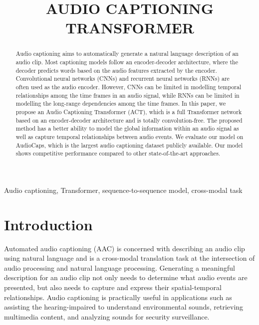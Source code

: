\documentclass{article}
\title{AUDIO CAPTIONING TRANSFORMER}
\begin{document}
\ninept
\maketitle

\begin{sloppy}

\begin{abstract}
Audio captioning aims to automatically generate a natural language description of an audio clip. Most captioning models follow an encoder-decoder architecture, where the decoder predicts words based on the audio features extracted by the encoder. Convolutional neural networks (CNNs) and recurrent neural networks (RNNs) are often used as the audio encoder. However, CNNs can be limited in modelling temporal relationships among the time frames in an audio signal, while RNNs can be limited in modelling the long-range dependencies among the time frames. In this paper, we propose an Audio Captioning Transformer (ACT), which is a full Transformer network based on an encoder-decoder architecture and is totally convolution-free. The proposed method has a better ability to model the global information within an audio signal as well as capture temporal relationships between audio events. We evaluate our model on AudioCaps, which is the largest audio captioning dataset publicly available. Our model shows competitive performance compared to other state-of-the-art approaches.
\end{abstract}

\begin{keywords}
Audio captioning, Transformer, sequence-to-sequence model, cross-modal task
\end{keywords}

\section{Introduction}
\label{sec:intro}
Automated audio captioning (AAC) is concerned with describing an audio clip using natural language and is a cross-modal translation task at the intersection of audio processing and natural language processing. Generating a meaningful description for an audio clip not only needs to determine what audio events are presented, but also needs to capture and express their spatial-temporal relationships. Audio captioning is practically useful in applications such as assisting the hearing-impaired to understand environmental sounds, retrieving multimedia content, and analyzing sounds for security surveillance. 


\end{sloppy}
\end{document}
